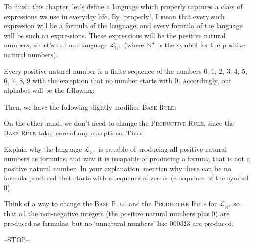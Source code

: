 To finish this chapter, let's define a language which properly captures a class of expressions we use in everyday life. By `properly', I mean that every such expression will be a formula of the language, and every formula of the language will be such an expressions. These expressions will be the positive natural numbers, so let's call our language $\mathcal{L}_{\mathbb{N}^+}$ (where ${\mathbb{N}^+}$ is the symbol for the positive natural numbers).

Every positive natural number is a finite sequence of the numbers $0$, $1$, $2$, $3$, $4$, $5$, $6$, $7$, $8$, $9$ with the exception that no number starts with $0$. Accordingly, our alphabet will be the following:


\noindent Then, we have the following slightly modified \textsc{Base Rule}:


\noindent On the other hand, we don't need to change the \textsc{Productive Rule}, since the \textsc{Base Rule} takes care of any exceptions. Thus: 


\begin{exc}
Explain why the language $\mathcal{L}_{\mathbb{N}^+}$ is capable of producing all positive natural numbers as formulas, and why it is incapable of producing a formula that is not a positive natural number. In your explanation, mention why there can be no formula produced that starts with a sequence of zeroes (a sequence of the symbol $0$).
\end{exc}

\begin{exc}\label{natnum}
Think of a way to change the \textsc{Base Rule} and the \textsc{Productive Rule} for $\mathcal{L}_{\mathbb{N}^+}$ so that all the non-negative integers (the positive natural numbers plus $0$) are produced as formulas, but no `unnatural numbers' like $000323$ are produced. 
\end{exc}

\begin{center}
	--STOP--
\end{center}

